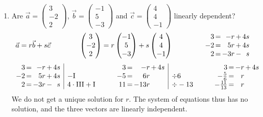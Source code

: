 \documentclass[12pt,eng]{skript_ogg}
\begin{document}
\begin{beispiel}
\begin{enumerate}
\bigskip

\item Are $\vec{a}=\begin{pmatrix}3\\-2\\2
\end{pmatrix}$, $\vec{b}=\begin{pmatrix}-1\\5\\-3
\end{pmatrix}$ and $\vec{c}=\begin{pmatrix}4\\4\\-1
\end{pmatrix}$ linearly dependent?
\[\vec{a}=r\vec{b}+s\vec{c}\qquad\qquad\begin{pmatrix}3\\-2\\2
\end{pmatrix}=r\begin{pmatrix}-1\\5\\-3
\end{pmatrix}+s\begin{pmatrix}4\\4\\-1
\end{pmatrix}\qquad\qquad\begin{array}{r@{\,}c@{\,}r@{\,}c@{\,}r}
3 & = & -r & + & 4s\\
-2 & = & 5r & + & 4s\\
2 & = & -3r & - & s\end{array}\]
\[\begin{array}{r@{\,}c@{\,}r@{\,}c@{\,}r|l}
3 & = & -r & + & 4s &\\
-2 & = & 5r & + & 4s & -\mbox{I}\\
2 & = & -3r & - & s &
4\cdot\mbox{III}+\mbox{I}\end{array}\qquad\begin{array}{r@{\,}c@{\,}r@{\,}c@{\,}r|l}
3 & = & -r & + & 4s &\\
-5 & = & 6r & & & \div 6\\
11 & = & -13r & & & \div
-13\end{array}\qquad\begin{array}{r@{\,}c@{\,}r@{\,}c@{\,}r}
3 & = & -r & + & 4s \\
-\frac{5}{6} & = & r & & \\
-\frac{11}{13} & = & r & & \end{array}\]
We do not get a unique solution for $r$. The system of equations thus has no solution, and the three vectors are  linearly independent.


\end{enumerate}
\end{beispiel}
\end{document}
